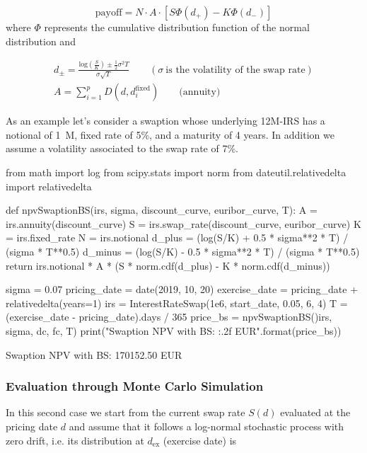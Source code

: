 \begin{equation}
\mathrm{payoff} = N\cdot A\cdot [S \Phi(d_+) - K\Phi(d_-)]
\end{equation}
where $\Phi$ represents the cumulative distribution function of the normal distribution and

\begin{equation}
\begin{gathered}d_{\pm} = \frac{\mathrm{log}(\frac{S}{K}) \pm \frac{1}{2}\sigma^{2}T}{\sigma\sqrt{T}}\qquad(\sigma~\textrm{is the volatility of the swap rate})\\
A =\sum_{i=1}^{p}D(d, d_{i}^{\mathrm{fixed}})\qquad\mathrm{(annuity})
\end{gathered}
\end{equation}

As an example let's consider a swaption whose underlying 12M-IRS has a notional of 1~M, fixed rate of 5\%, and a maturity of 4 years. In addition we assume a volatility associated to the swap rate of 7\%.

\begin{ipython}
from math import log
from scipy.stats import norm
from dateutil.relativedelta import relativedelta

def npvSwaptionBS(irs, sigma, discount_curve, euribor_curve, T):
    A = irs.annuity(discount_curve)
    S = irs.swap_rate(discount_curve, euribor_curve)
    K = irs.fixed_rate
    N = irs.notional
    d_plus = (log(S/K) + 0.5 * sigma**2 * T) / (sigma * T**0.5)
    d_minus = (log(S/K) - 0.5 * sigma**2 * T) / (sigma * T**0.5)
    return irs.notional * A * (S * norm.cdf(d_plus) - K * norm.cdf(d_minus))

sigma = 0.07
pricing_date = date(2019, 10, 20)
exercise_date = pricing_date + relativedelta(years=1)
irs = InterestRateSwap(1e6, start_date, 0.05, 6, 4)
T = (exercise_date - pricing_date).days / 365
price_bs = npvSwaptionBS()irs, sigma, dc, fc, T)
print("Swaption NPV with BS: {:.2f} EUR".format(price_bs))
\end{ipython}
\begin{ioutput}
Swaption NPV with BS: 170152.50 EUR
\end{ioutput}

\subsubsection{Evaluation through Monte Carlo Simulation}
\label{evaluation-through-monte-carlo-simulation}

In this second case we start from the current swap rate \(S(d)\) evaluated at the pricing date \(d\) and assume that it follows a log-normal stochastic process with zero drift, i.e. its distribution at \(d_{\mathrm{ex}}\) (exercise date) is 

